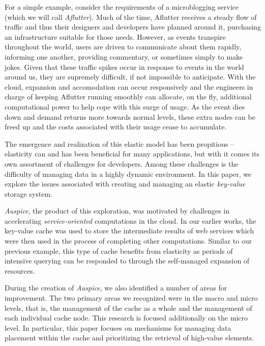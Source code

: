 For a simple example, consider the requirements of a microblogging service
(which we will call \emph{Aflutter}). Much of the time, Aflutter receives a
steady flow of traffic and thus their designers and developers have planned
around it, purchasing an infrastructure suitable for those needs. However, as
events transpire throughout the world, users are driven to communicate about
them rapidly, informing one another, providing commentary, or sometimes simply
to make jokes. Given that these traffic spikes occur in response to events in
the world around us, they are supremely difficult, if not impossible to
anticipate. With the cloud, expansion and accomodation can occur responsively
and the engineers in charge of keeping Aflutter running smoothly can allocate,
on the fly, additional computational power to help cope with this surge of
usage. As the event dies down and demand returns more towards normal levels,
these extra nodes can be freed up and the costs associated with their usage
cease to accumulate.

The emergence and realization of this elastic model has been propitious --
elasticity can and has been beneficial for many applications, but with it comes
its own assortment of challenges for developers. Among these challenges is the
difficulty of managing data in a highly dynamic environment. In this paper, we
explore the issues associated with creating and managing an elastic
\emph{key-value} storage system.

\emph{Auspice}, the product of this exploration, was motivated by challenges in
accelerating \emph{service-oriented} computations in the cloud. In our earlier
works, the key-value cache was used to store the intermediate results of web
services which were then used in the process of completing other computations.
Similar to our previous example, this type of cache benefits from elasticity as
periods of intensive querying can be responded to through the self-managed
expansion of resources.

During the creation of \emph{Auspice}, we also identified a number of areas for
improvement. The two primary areas we recognized were in the macro and micro
levels, that is, the management of the cache as a whole and the management of
each individual cache node. This research is focused additionally on the micro
level. In particular, this paper focuses on mechanisms for managing data
placement within the cache and prioritizing the retrieval of high-value
elements.


